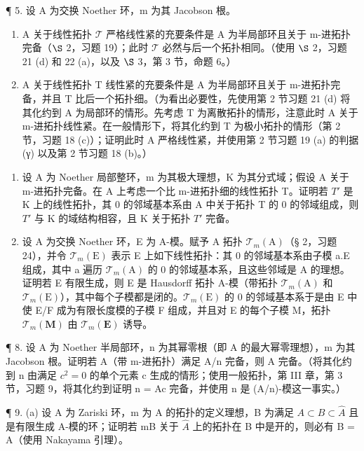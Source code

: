 ¶ 5. 设 A 为交换 Noether 环，m 为其 Jacobson 根。

\begin{enumerate}
\def\labelenumi{(\alph{enumi})}
\item
  A 关于线性拓扑 \(\mathcal{T}\) 严格线性紧的充要条件是 A 为半局部环且关于 m-进拓扑完备（\(\S\) 2，习题 19）；此时 \(\mathcal{T}\) 必然与后一个拓扑相同。（使用 \(\S\) 2，习题 21 (d) 和 22 (a)，以及 \(\S\) 3，第 3 节，命题 6。）
\item
  A 关于线性拓扑 T 线性紧的充要条件是 A 为半局部环且关于 m-进拓扑完备，并且 T 比后一个拓扑细。（为看出必要性，先使用第 2 节习题 21 (d) 将其化约到 A 为局部环的情形。先考虑 T 为离散拓扑的情形，注意此时 A 关于 m-进拓扑线性紧。在一般情形下，将其化约到 T 为极小拓扑的情形（第 2 节，习题 18 (c)）；证明此时 A 严格线性紧，并使用第 2 节习题 19 (a) 的判据 (γ) 以及第 2 节习题 18 (b)。）
\end{enumerate}

\begin{enumerate}
\def\labelenumi{\arabic{enumi}.}
\setcounter{enumi}{5}
\item
  设 A 为 Noether 局部整环，m 为其极大理想，K 为其分式域；假设 A 关于 m-进拓扑完备。在 A 上考虑一个比 m-进拓扑细的线性拓扑 T。证明若 \(T'\) 是 K 上的线性拓扑，其 0 的邻域基本系由 A 中关于拓扑 T 的 0 的邻域组成，则 \(T'\) 与 K 的域结构相容，且 K 关于拓扑 \(T'\) 完备。
\item
  设 A 为交换 Noether 环，E 为 A-模。赋予 A 拓扑 \(\mathcal{T}_{m}(\mathrm{A})\)（§ 2，习题 24），并令 \(\mathcal{T}_{m}(\mathrm{E})\) 表示 E 上如下线性拓扑：其 0 的邻域基本系由子模 a.E 组成，其中 a 遍历 \(\mathcal{T}_{m}(\mathrm{A})\) 的 0 的邻域基本系，且这些邻域是 A 的理想。证明若 E 有限生成，则 E 是 Hausdorff 拓扑 A-模（带拓扑 \(\mathcal{T}_{m}(\mathrm{A})\) 和 \(\mathcal{T}_{m}(\mathrm{E})\)），其中每个子模都是闭的。\(\mathcal{T}_{m}(\mathrm{E})\) 的 0 的邻域基本系于是由 E 中使 E/F 成为有限长度模的子模 F 组成，并且对 E 的每个子模 M，拓扑 \(\mathcal{T}_{m}(\mathbf{M})\) 由 \(\mathcal{T}_{m}(\mathbf{E})\) 诱导。
\end{enumerate}

¶ 8. 设 A 为 Noether 半局部环，n 为其幂零根（即 A 的最大幂零理想），m 为其 Jacobson 根。证明若 A（带 m-进拓扑）满足 A/n 完备，则 A 完备。（将其化约到 n 由满足 \(c^{2} = 0\) 的单个元素 c 生成的情形；使用一般拓扑，第 III 章，第 3 节，习题 9，将其化约到证明 n = Ac 完备，并使用 n 是 (A/n)-模这一事实。）

¶ 9. (a) 设 A 为 Zariski 环，m 为 A 的拓扑的定义理想，B 为满足 \(A \subset B \subset \hat{A}\) 且是有限生成 A-模的环；证明若 mB 关于 \(\hat{A}\) 上的拓扑在 B 中是开的，则必有 B = A（使用 Nakayama 引理）。

